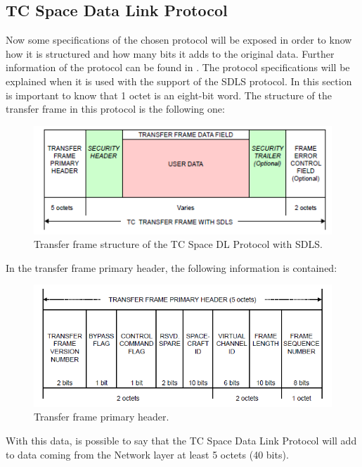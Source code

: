 \subsection{TC Space Data Link Protocol}
Now some specifications of the chosen protocol will be exposed in order to know how it is structured and how many bits it adds to the original data. Further information of the protocol can be found in \cite{CCSDS2010}. The protocol specifications will be explained when it is used with the support of the SDLS protocol. In this section is important to know that 1 octet is an eight-bit word. The structure of the transfer frame in this protocol is the following one: 
\begin{figure}[H]
\begin{center}
\includegraphics[scale=1]{transferfram.PNG}    
\caption{Transfer frame structure of the TC Space DL Protocol with SDLS.}
\end{center}
\end{figure}  
In the transfer frame primary header, the following information is contained:
\begin{figure}[H]
\begin{center}
\includegraphics[scale=1]{transferframeprimaryheader.PNG}   
\caption{Transfer frame primary header.}
\end{center}
\end{figure} 
With this data, is possible to say that the TC Space Data Link Protocol will add to data coming from the Network layer at least 5 octets (40 bits).
